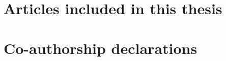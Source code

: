 \documentclass[11pt, a4paper, openany]{memoir}
\begin{document}
\begin{refcontext}
    \small
    \setlength{\bibitemsep}{0pt}
    \printbibliography
\end{refcontext}

\begin{appendix}
\chapter{Articles included in this thesis}
\label{appendix:articles}







\chapter{Co-authorship declarations}




\end{appendix}
\end{document}
